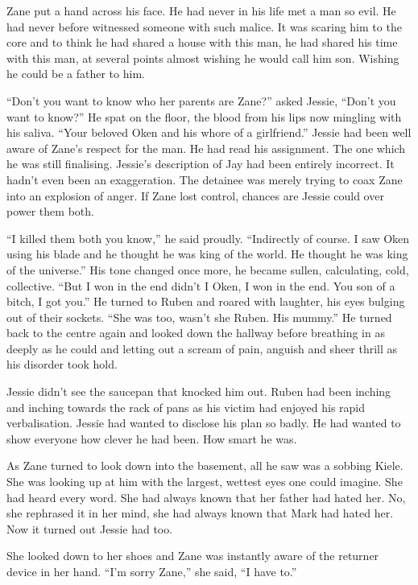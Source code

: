 Zane put a hand across his face.  He had never in his life met a man so evil.  He had never before witnessed someone with such malice.  It was scaring him to the core and to think he had shared a house with this man, he had shared his time with this man, at several points almost wishing he would call him son.  Wishing he could be a father to him.

``Don't you want to know who her parents are Zane?'' asked Jessie, ``Don't you want to know?''  He spat on the floor, the blood from his lips now mingling with his saliva.  ``Your beloved Oken and his whore of a girlfriend.''  Jessie had been well aware of Zane's respect for the man.  He had read his assignment.  The one which he was still finalising.  Jessie's description of Jay had been entirely incorrect.  It hadn't even been an exaggeration.  The detainee was merely trying to coax Zane into an explosion of anger.  If Zane lost control, chances are Jessie could over power them both.

``I killed them both you know,'' he said proudly.  ``Indirectly of course.  I saw Oken using his blade and he thought he was king of the world.  He thought he was king of the universe.''  His tone changed once more, he became sullen, calculating, cold, collective.  ``But I won in the end didn't I Oken, I won in the end.  You son of a bitch, I got you.''  He turned to Ruben and roared with laughter, his eyes bulging out of their sockets.  ``She was too, wasn't she Ruben.  His mummy.''  He turned back to the centre again and looked down the hallway before breathing in as deeply as he could and letting out a scream of pain, anguish and sheer thrill as his disorder took hold.

Jessie didn't see the saucepan that knocked him out.  Ruben had been inching and inching towards the rack of pans as his victim had enjoyed his rapid verbalisation.  Jessie had wanted to disclose his plan so badly.  He had wanted to show everyone how clever he had been.  How smart he was.  

As Zane turned to look down into the basement, all he saw was a sobbing Kiele.  She was looking up at him with the largest, wettest eyes one could imagine.  She had heard every word.  She had always known that her father had hated her.  No, she rephrased it in her mind, she had always known that Mark had hated her.  Now it turned out Jessie had too.  

She looked down to her shoes and Zane was instantly aware of the returner device in her hand.  ``I'm sorry Zane,'' she said, ``I have to.''

